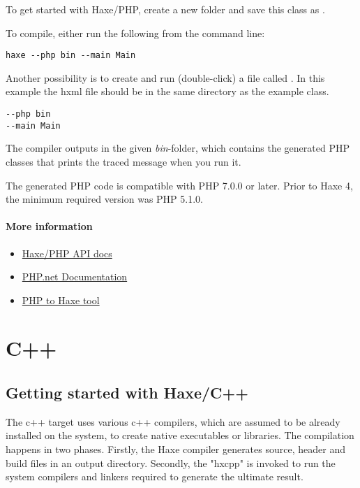 To get started with Haxe/PHP, create a new folder and save this class as .


To compile, either run the following from the command line:

\begin{lstlisting}
haxe --php bin --main Main
\end{lstlisting}

Another possibility is to create and run (double-click) a file called . In this example the hxml file should be in the same directory as the example class.

\begin{lstlisting}
--php bin
--main Main
\end{lstlisting}

The compiler outputs in the given \emph{bin}-folder, which contains the generated PHP classes that prints the traced message when you run it.


The generated PHP code is compatible with PHP 7.0.0 or later. Prior to Haxe 4, the minimum required version was PHP 5.1.0.

\paragraph{More information}

\begin{itemize}
	\item \href{https://api.haxe.org/php/}{Haxe/PHP API docs}
	\item \href{http://php.net/docs.php}{PHP.net Documentation}
	\item \href{http://phptohaxe.haqteam.com/code.php}{PHP to Haxe tool}
\end{itemize}


\section{C++}
\label{target-cpp}

\subsection{Getting started with Haxe/C++}
\label{target-cpp-getting-started}
The c++ target uses various c++ compilers, which are assumed to be already installed on the system, to create native executables or libraries.  The compilation happens in two phases.  Firstly, the Haxe compiler generates source, header and build files in an output directory.  Secondly, the "hxcpp"  is invoked to run the system compilers and linkers required to generate the ultimate result.


